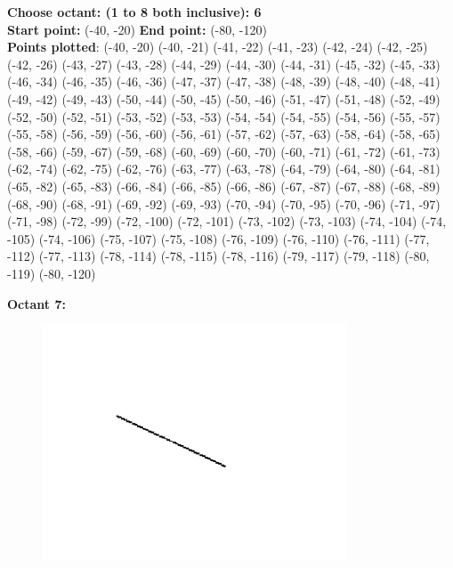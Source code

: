 \documentclass[12pt,letterpaper]{article}
\begin{document}
\textbf{Choose octant: (1 to 8 both inclusive): 6}\\
\textbf{Start point:} (-40, -20)
\textbf{End point:} (-80, -120)\\
\textbf{Points plotted}: 
(-40, -20) (-40, -21) (-41, -22) (-41, -23) 
(-42, -24) (-42, -25) (-42, -26) (-43, -27) 
(-43, -28) (-44, -29) (-44, -30) (-44, -31) 
(-45, -32) (-45, -33) (-46, -34) (-46, -35) 
(-46, -36) (-47, -37) (-47, -38) (-48, -39) 
(-48, -40) (-48, -41) (-49, -42) (-49, -43) 
(-50, -44) (-50, -45) (-50, -46) (-51, -47) 
(-51, -48) (-52, -49) (-52, -50) (-52, -51) 
(-53, -52) (-53, -53) (-54, -54) (-54, -55) 
(-54, -56) (-55, -57) (-55, -58) (-56, -59) 
(-56, -60) (-56, -61) (-57, -62) (-57, -63) 
(-58, -64) (-58, -65) (-58, -66) (-59, -67) 
(-59, -68) (-60, -69) (-60, -70) (-60, -71) 
(-61, -72) (-61, -73) (-62, -74) (-62, -75) 
(-62, -76) (-63, -77) (-63, -78) (-64, -79) 
(-64, -80) (-64, -81) (-65, -82) (-65, -83) 
(-66, -84) (-66, -85) (-66, -86) (-67, -87) 
(-67, -88) (-68, -89) (-68, -90) (-68, -91) 
(-69, -92) (-69, -93) (-70, -94) (-70, -95) 
(-70, -96) (-71, -97) (-71, -98) (-72, -99) 
(-72, -100) (-72, -101) (-73, -102) (-73, -103) 
(-74, -104) (-74, -105) (-74, -106) (-75, -107) 
(-75, -108) (-76, -109) (-76, -110) (-76, -111) 
(-77, -112) (-77, -113) (-78, -114) (-78, -115) 
(-78, -116) (-79, -117) (-79, -118) (-80, -119) 
(-80, -120)


\newpage
\textbf{Octant 7:}
\begin{figure}[h]
    \centering
    \includegraphics[height=7cm]{Outputs/O7-1.png}
\end{figure}
\end{document}
